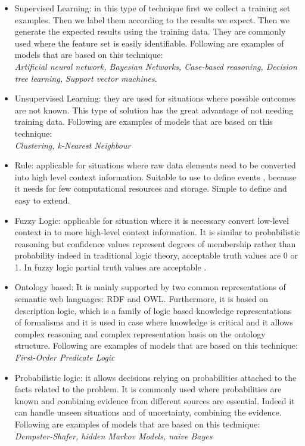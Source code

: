 \documentclass{thesisreport}
\begin{document}
 \begin{itemize}
     \item Supervised Learning: in this type of technique first we collect a training set examples. Then we label them according to the results we expect. Then we generate the expected results using the training data.
     They are commonly used where the feature set is easily identifiable. Following are examples of models that are based on this technique:\\ \textit{Artificial neural network, Bayesian Networks, Case-based reasoning, Decision tree learning, Support vector machines}.
     
     \item Unsupervised Learning: they are used for situations where possible outcomes are not known. This type of solution has the great advantage of not needing training data. Following are examples of models that are based on this technique:\\ \textit{Clustering, k-Nearest Neighbour}
     
     \item Rule: applicable for situations where raw data elements need to be converted into high level context information. Suitable to use to define events , because it needs for few computational resources and storage. Simple to define and easy to extend.
     
     \item Fuzzy Logic: applicable for situation where it is necessary convert low-level context in to more high-level context information. It is similar to probabilistic reasoning but confidence values represent degrees of membership rather than probability indeed in traditional logic theory, acceptable truth values are 0 or 1. In fuzzy logic partial truth values are acceptable \cite{perera2014context}.
     
     \item Ontology based: It is mainly supported by two common representations of semantic web languages: RDF and OWL. Furthermore, it is based on description logic, which is a family of logic based knowledge representations of formalisms and it is used in case where knowledge is critical and it allows complex reasoning and complex representation basis on the ontology structure. Following are examples of models that are based on this technique:\\ \textit{First-Order Predicate Logic}
     
     \item Probabilistic logic: it allows decisions relying on probabilities attached to the facts related to the problem. It is commonly used where probabilities are known and combining evidence from different sources are essential. Indeed it can handle unseen situations and of uncertainty, combining the evidence. Following are examples of models that are based on this technique:\\ \textit{Dempster-Shafer, hidden Markov Models, naive Bayes}
 \end{itemize}
\end{document}
